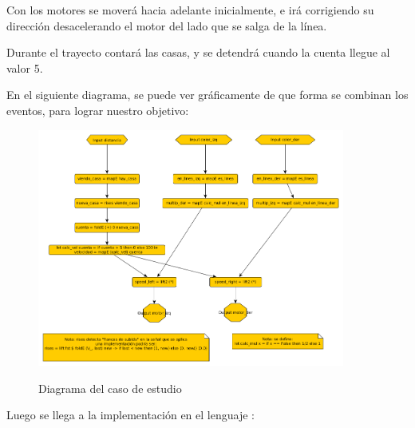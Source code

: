  Con los motores se moverá hacia adelante inicialmente, e irá corrigiendo
  su dirección desacelerando el motor del lado que se salga de la línea.

  Durante el trayecto contará las casas, y se detendrá cuando la cuenta
llegue al valor 5.

  En el siguiente diagrama, se puede ver gráficamente de que forma
se combinan los eventos, para lograr nuestro objetivo:

\begin{figure}[hbtp]
\begin{center}
\caption{Diagrama del caso de estudio}
\includegraphics[width=0.9\textwidth]{graphs/delivery.png}
\label{fig:delivery}
\end{center}
\end{figure}

  Luego se llega a la implementación en el lenguaje \frob :

